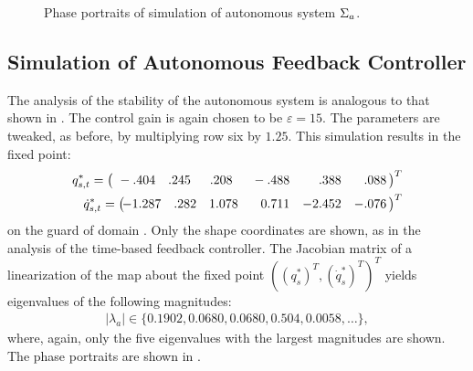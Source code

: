 \begin{figure*}[tp!]
  \centering
  \caption{Phase portraits of simulation of autonomous system $\Sigma_a$.}
  \label{fig:pp-a}
\end{figure*} 

\subsection{Simulation of Autonomous Feedback Controller}
The analysis of the stability of the autonomous system is analogous to that
shown in .
%
The control gain is again chosen to be $\varepsilon = 15$.
%
The parameters are tweaked, as before, by multiplying row six by $1.25$.
%
This simulation results in the fixed point:
%
\begin{align*}
  q_{s,t}^{*} =
  \left(\!\!\!\!\begin{array}{r r r r r r}
      \hphantom{1}-.404 & .245 & \hphantom{1}.208 & \hphantom{0}-.488 &
      \hphantom{-0}.388 & \hphantom{-}.088
  \end{array}\!\!\right)^T\\
  {\dot q}_{s,t}^{*} =
  \left(\!\!\!\!\begin{array}{r r r r r r}
    -1.287 & .282 & 1.078 & \hphantom{-}0.711 & -2.452 & -.076
  \end{array}\!\!\right)^T
\end{align*}
on the guard of domain {\DC}.
%
Only the shape coordinates are shown, as in the analysis of the time-based
feedback controller.
%
The Jacobian matrix of a linearization of the \Poincare{} map about the fixed
point $((q^*_s)^T, ({\dot q}^*_s)^T)^T$ yields eigenvalues of the following
magnitudes:
\begin{align*}
  |\lambda_a| \in \{0.1902, 0.0680, 0.0680, 0.504, 0.0058, \ldots\},
\end{align*}
where, again, only the five eigenvalues with the largest magnitudes are shown.
%
The phase portraits are shown in .